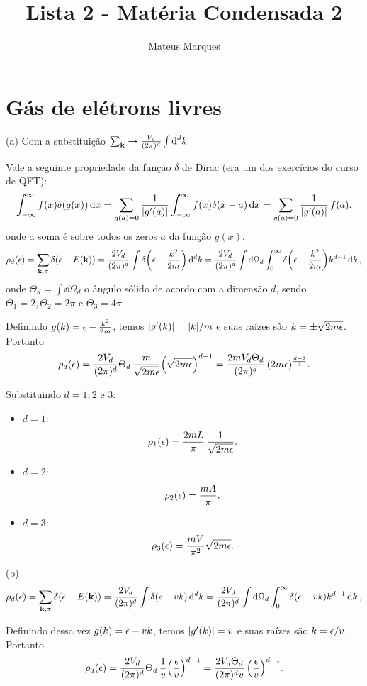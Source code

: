 \documentclass[a4paper,10pt]{article}
\title{\Huge{\textbf{Lista 2 - Matéria Condensada 2}}}
\author{Mateus Marques}
\begin{document}
\maketitle


\section{Gás de elétrons livres}

(a) Com a substituição $\sum_{\vb{k}} \to \frac{V_d}{(2\pi)^d} \int \dd[d]{k}$

Vale a seguinte propriedade da função $\delta$ de Dirac (era um dos exercícios do curso de QFT):
$$
\int_{-\infty}^{\infty} f(x) \delta(g(x)) \dd{x} =
\sum_{g(a)=0} \frac{1}{\abs{g'(a)}} \int_{-\infty}^{\infty} f(x) \delta(x-a) \dd{x}=
\sum_{g(a)=0} \frac{1}{\abs{g'(a)}} \, f(a).
$$
onde a soma é sobre todos os zeros $a$ da função $g(x)$.
$$
\rho_d(\epsilon) = \sum_{\vb{k}, \sigma} \delta(\epsilon - E(\vb{k})) =
\frac{2V_d}{(2\pi)^d} \int \delta\qty(\epsilon - \frac{k^2}{2m}) \dd[d]{k} =
\frac{2V_d}{(2\pi)^d} \int \dd{\Omega_d} \int_0^\infty \delta\qty(\epsilon - \frac{k^2}{2m}) k^{d-1} \dd{k},
$$
onde $\Theta_d = \int \dd{\Omega_d}$ o ângulo sólido de acordo com a dimensão $d$, sendo $\Theta_1 = 2, \Theta_2 = 2\pi$ e $\Theta_3 = 4\pi$.

Definindo $g(k) = \epsilon - \frac{k^2}{2m}$, temos $\abs{g'(k)} = \abs{k} / m$ e suas raízes são $k = \pm \sqrt{2m \epsilon}$. Portanto
$$
\rho_d(\epsilon) = \frac{2V_d}{(2\pi)^d} \Theta_d \, \frac{m}{\sqrt{2m\epsilon}}
\qty(\sqrt{2m \epsilon})^{d-1} = \frac{2 m V_d \Theta_d}{(2\pi)^d} \, (2m\epsilon)^{\frac{d-2}{2}}.
$$

Substituindo $d = 1, 2$ e $3$:
\begin{itemize}
\item $d = 1$:
$$
\rho_1(\epsilon) = \frac{2 m L}{\pi} \, \frac{1}{\sqrt{2m\epsilon}}.
$$
\item $d = 2$:
$$
\rho_2(\epsilon) = \frac{m A}{\pi}.
$$
\item $d = 3$:
$$
\rho_3(\epsilon) = \frac{m V}{\pi^2} \sqrt{2m\epsilon}.
$$
\end{itemize}

(b)
$$
\rho_d(\epsilon) = \sum_{\vb{k}, \sigma} \delta(\epsilon - E(\vb{k})) =
\frac{2V_d}{(2\pi)^d} \int \delta\qty(\epsilon - vk) \dd[d]{k} =
\frac{2V_d}{(2\pi)^d} \int \dd{\Omega_d} \int_0^\infty \delta\qty(\epsilon - vk) k^{d-1} \dd{k},
$$

Definindo dessa vez $g(k) = \epsilon - vk$, temos $\abs{g'(k)} = v$ e suas raízes são $k = \epsilon/v$. Portanto
$$
\rho_d(\epsilon) = \frac{2V_d}{(2\pi)^d} \Theta_d \, \frac{1}{v}
\qty(\frac{\epsilon}{v})^{d-1} = \frac{2 V_d \Theta_d}{(2\pi)^d v} \, \qty(\frac{\epsilon}{v})^{d-1}.
$$
\end{document}
